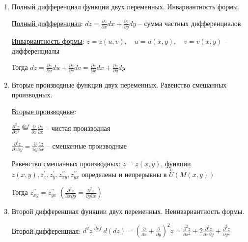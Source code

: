 \documentclass[12pt]{article}
\begin{document}
\begin{enumerate}
        \item Полный дифференциал функции двух переменных. Инвариантность формы.

        \hyperlink{completedifferentialoffunctionoftwovariables}{Полный дифференциал}: $\displaystyle dz = \frac{\partial z}{\partial x} dx + \frac{\partial z}{\partial y} dy$ -- сумма частных дифференциалов

        \hyperlink{invariantofdifferentialoffunctionoftwovariables}{Инвариантность формы}: $\displaystyle z = z(u, v), \quad u = u(x, y), \quad v = v(x, y)$ -- дифференциалы

        Тогда $\displaystyle dz = \frac{\partial z}{\partial u}du + \frac{\partial z}{\partial v} dv = \frac{\partial z}{\partial x} dx + \frac{\partial z}{\partial y} dy$

        \item Вторые производные функции двух переменных. Равенство смешанных производных.

        \hyperlink{secondderivativeoffunctionoftwovariables}{Вторые производные}:

        $\displaystyle \frac{\partial^2 z}{\partial x^2} \stackrel{def}{=} \frac{\partial}{\partial x} \frac{\partial z}{\partial x}$ -- чистая производная

        $\displaystyle \frac{\partial^2 z}{\partial x \partial y} = \frac{\partial}{\partial y} \frac{\partial z}{\partial x}$ -- смешанные производные

        \hyperlink{equalityofsecondderivativesoffunctionoftwovariables}{Равенство смешанных производных}: $\displaystyle z = z(x, y)$, функции $\displaystyle z(x, y), z^\prime_x, z^\prime_y, z^{\prime\prime}_{xy}, z^{\prime\prime}_{yx}$ определены и непрерывны в $\displaystyle \stackrel{o}{U}(M(x, y))$

        Тогда $\displaystyle z^{\prime\prime}_{xy} = z^{\prime\prime}_{yx}$ $\left(\frac{\partial^2 z}{\partial x \partial y} = \frac{\partial^2 z}{\partial y \partial x}\right)$

        \item Второй дифференциал функции двух переменных. Неинвариантность формы.

        \hyperlink{seconddifferentialoffunctionoftwovariables}{Второй дифференциал}: $\displaystyle d^2 z \stackrel{def}{=} d(dz) = \left(\frac{\partial}{\partial x} + \frac{\partial}{\partial y}\right)^2 z = \frac{\partial^2 z}{\partial x^2} + 2 \frac{\partial^2 z}{\partial x \partial y} + \frac{\partial^2 z}{\partial y^2}$


\end{enumerate}
\end{document}
